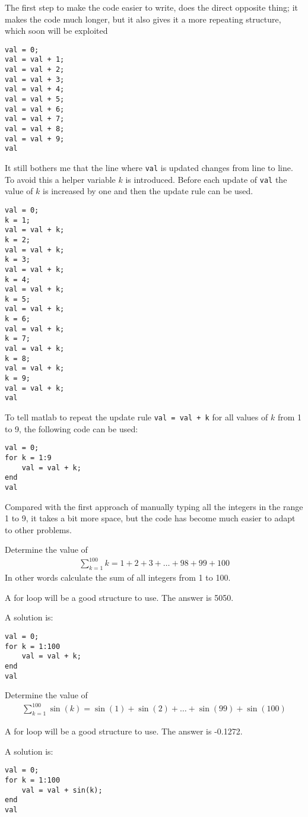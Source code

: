 The first step to make the code easier to write, does the
direct opposite thing; it makes the code much longer, but it 
also gives it a more repeating structure, which soon will be 
exploited 
\begin{lstlisting}
val = 0;
val = val + 1;
val = val + 2;
val = val + 3;
val = val + 4;
val = val + 5;
val = val + 6;
val = val + 7;
val = val + 8;
val = val + 9;
val
\end{lstlisting}
It still bothers me that the line where \verb!val! is updated
changes from line to line.
To avoid this a helper variable $k$ is introduced.
Before each update of \verb!val! the value of $k$ is 
increased by one and then the update rule can be used.
\begin{lstlisting}
val = 0;
k = 1;
val = val + k;
k = 2;
val = val + k;
k = 3;
val = val + k;
k = 4;
val = val + k;
k = 5;
val = val + k;
k = 6;
val = val + k;
k = 7;
val = val + k;
k = 8;
val = val + k;
k = 9;
val = val + k;
val
\end{lstlisting}
To tell matlab to repeat the update rule \verb!val = val + k! for
all values of $k$ from 1 to 9, the following code can be used:
\begin{lstlisting}
val = 0;
for k = 1:9
    val = val + k;
end
val
\end{lstlisting}
Compared with the first approach of manually typing
all the integers in the range 1 to 9, it takes a bit more space, 
but the code has become much easier to adapt to other problems.


\begin{ex}\label{exSumIntegersUp100}%
Determine the value of 
\begin{align*}
\sum_{k = 1}^{100} k = 1 + 2 + 3 + \ldots + 98 + 99 + 100
\end{align*}
In other words calculate the sum of all integers from 1 to 100.
\begin{hint}
A for loop will be a good structure to use.
The answer is 5050.
\end{hint}
\begin{sol}
A solution is:
\begin{lstlisting}
val = 0;
for k = 1:100
    val = val + k;
end
val
\end{lstlisting}
\end{sol}
\end{ex}

\begin{ex}
Determine the value of 
\begin{align*}
\sum_{k = 1}^{100} \sin(k) = \sin(1) + \sin(2) + \ldots + \sin(99) + \sin(100)
\end{align*}
\begin{hint}
A for loop will be a good structure to use.
The answer is -0.1272.
\end{hint}
\begin{sol}
A solution is:
\begin{lstlisting}
val = 0;
for k = 1:100
    val = val + sin(k);
end
val
\end{lstlisting}
\end{sol}
\end{ex}


